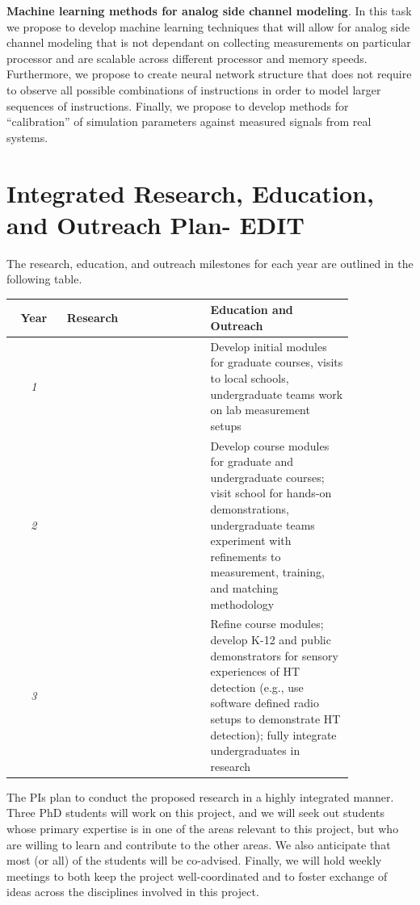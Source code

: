 \documentclass[11 pt]{article}
\begin{document}
\textbf{Machine learning methods for analog side channel modeling}. In this task we propose to develop machine learning techniques that will allow for analog side channel modeling that is not dependant on collecting measurements on particular processor and are scalable across different processor and memory speeds. Furthermore, we propose to create neural network structure that does not require to observe all possible combinations of instructions in order to model larger sequences of instructions. Finally, we propose to develop methods for ``calibration'' of simulation parameters against measured signals from real systems.



\section{Integrated Research, Education, and Outreach Plan- EDIT}
The research, education, and outreach milestones for each year are outlined in the following table.
\begin{small}
\begin{tabular}{||c|p{0.42\linewidth}|p{0.42\linewidth}||}
\hline
\hline
\textbf{Year} & \textbf{Research} & \textbf{Education and Outreach}\\
\hline
\textit{1} &
  &
Develop initial modules for graduate courses, visits to local schools, undergraduate teams work on lab measurement setups\\
\hline
\textit{2} &
&
Develop course modules for graduate and undergraduate courses; visit school for hands-on demonstrations, undergraduate teams experiment with refinements to measurement, training, and matching methodology \\
\hline
\textit{3}  & 
 &
Refine course modules; develop K-12 and public demonstrators for sensory experiences of HT detection (e.g., use software defined radio setups to demonstrate HT detection); fully integrate undergraduates in research\\
\hline
\hline
\end{tabular}
\end{small}

The PIs plan to conduct the proposed research in a highly integrated manner.
Three PhD students will work on this project, and we will seek out students
whose primary expertise is in one of the areas relevant to this project,
but who are willing to learn and contribute to the other areas. We also
anticipate that most (or all) of the students will be co-advised. Finally,
we will hold weekly meetings to both keep the project well-coordinated and
to foster exchange of ideas across the disciplines involved in this project.
\end{document}
